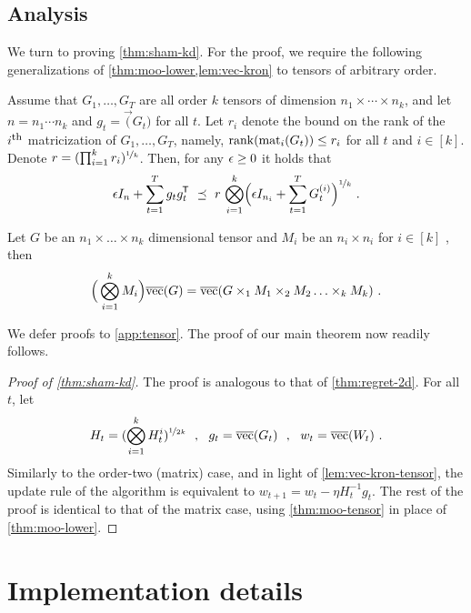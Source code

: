 \subsection{Analysis}

We turn to proving \cref{thm:sham-kd}.
For the proof, we require the following generalizations of \cref{thm:moo-lower,lem:vec-kron} to tensors of arbitrary order.


\begin{lemma} \label{thm:moo-tensor}
Assume that $G_1,\ldots,G_T$ are all order $k$ tensors of dimension $n_1 \times \cdots \times n_k$, and let $n = n_1 \cdots n_k$ and $g_t = \vec(G_t)$ for all $t$.
Let $r_i$ denote the bound on the rank of the $i^{\footnotesize \mbox{th}}$ matricization of  $G_1,\ldots,G_T$, namely,
$\mathrm{rank}(\mathrm{mat}_{i}(G_t)) \le r_i$ for all $t$ and $i \in [k]$. Denote $r = (\prod_{i=1}^{k} r_i)^{\nicefrac{1}{k}}$.
Then, for any $\epsilon \ge 0$ it holds that
\begin{align*}
\epsilon I_{n} + \sum_{t=1}^T g_t g_t^{\mkern-1.5mu\scriptstyle\mathsf{T}}
~\preceq~
r \, \bigotimes_{i=1}^k \mathopen{}\Big(\epsilon I_{n_i} + \sum_{t=1}^T G_t^{(i)}\Big)^{\nicefrac{1}{k}} ~ .
\end{align*}
\end{lemma}


\begin{lemma} \label{lem:vec-kron-tensor}
Let $G$ be an $n_1\times\ldots\times n_k$ dimensional tensor and $M_i$ be an $n_i \times n_i$ for $i \in [k]$ , then
\begin{align*}
\mathopen{}\Big(\bigotimes_{i=1}^k M_i\Big)\overline{\mathrm{vec}}(G)
=
\overline{\mathrm{vec}}(G \times_1 M_1 \times_2 M_2 \ldots \times_k M_k) ~
.
\end{align*}
\end{lemma}

We defer proofs to \cref{app:tensor}. The proof of our main theorem now readily follows.

\begin{proof}[Proof of \cref{thm:sham-kd}]
The proof is analogous to that of \cref{thm:regret-2d}.
For all $t$, let 
$$H_t = (\bigotimes_{i=1}^k H_t^i)^{\nicefrac{1}{2k}} ~~, ~~ g_t = \overline{\mathrm{vec}}(G_t) ~~ , ~~ w_t = \overline{\mathrm{vec}}(W_t) ~.$$
Similarly to the order-two (matrix) case, and in light of \cref{lem:vec-kron-tensor}, the update rule of the algorithm is equivalent to
$
w_{t+1} = w_t - \eta H_t^{-1} g_t.
$
The rest of the proof is identical to that of the matrix case, using \cref{thm:moo-tensor} in place of \cref{thm:moo-lower}.
\end{proof}

\section{Implementation details}\label{sec:impl}

